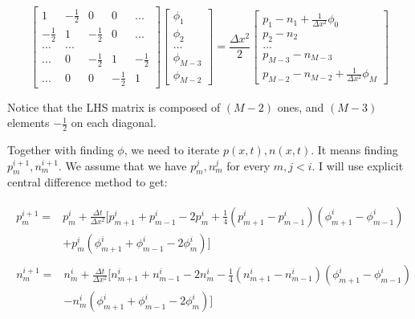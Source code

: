 \documentclass[12pt]{article}
\begin{document}
\begin{equation}
       \begin{bmatrix}
          1 & -\frac{1}{2} & 0 & 0 & ... \\
          -\frac{1}{2} & 1 & -\frac{1}{2} & 0 & ... \\
          ... & ... \\
          ... & 0 & -\frac{1}{2} & 1 & -\frac{1}{2} \\
          ... & 0 & 0 & -\frac{1}{2} & 1
       \end{bmatrix}
       \begin{bmatrix}
          \phi_1 \\
          \phi_2 \\
          ... \\
          \phi_{M-3} \\
          \phi_{M-2}
       \end{bmatrix}    
         =
         \frac{\Delta x^2}{2}
          \begin{bmatrix}
           p_1 - n_1 + \frac{1}{\Delta x^2} \phi_0 \\
           p_2 - n_2 \\
           ... \\
           p_{M-3} - n_{M-3} \\
           p_{M-2} - n_{M-2} + \frac{1}{\Delta x^2} \phi_M
        
           \end{bmatrix}
\end{equation}

Notice that the LHS matrix is composed of $(M-2)$ ones, and $(M-3)$ elements $-\frac{1}{2}$ on each diagonal.  

Together with finding $\phi$, we need to iterate $p(x,t), n(x,t)$. It means finding $p_m^{i+1}, n_m^{i+1}$. We assume that we have $p_m^j, n_m^j$ for every $m, j<i$.
I will use explicit central difference method to get:

\begin{align}
    \begin{split}
        p_m^{i+1} = {}& p_m^{i} + \frac{\Delta t}{\Delta x^2} [ p_{m+1}^i + p_{m-1}^i - 2p_m^i + \frac{1}{4}(p_{m+1}^i-p_{m-1}^i)(\phi_{m+1}^i-\phi_{m-1}^i) \\
        & + p_m^i(\phi_{m+1}^i+\phi_{m-1}^i-2\phi_m^i) ]
    \end{split} \\
    \begin{split}
        n_m^{i+1} = {}& n_m^{i} + \frac{ \Delta t}{\Delta x^2} [ n_{m+1}^i + n_{m-1}^i - 2n_m^i - \frac{1}{4}(n_{m+1}^i-n_{m-1}^i)(\phi_{m+1}^i-\phi_{m-1}^i) \\
        & - n_m^i(\phi_{m+1}^i+\phi_{m-1}^i-2\phi_m^i) ]
    \end{split}
\end {align}
\end{document}
